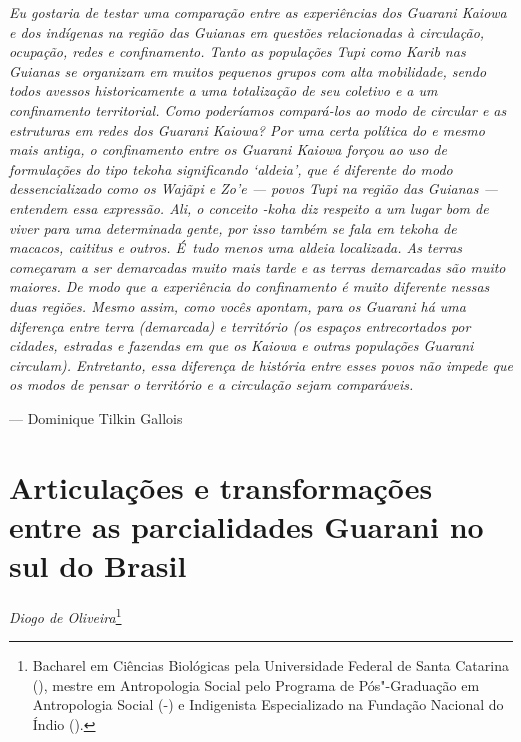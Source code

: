\begin{flushright}
\begin{minipage}[c]{0.85\textwidth}
\raggedleft
\footnotesize
\emph{Eu gostaria de testar uma comparação entre as experiências dos Guarani
Kaiowa e dos indígenas na região das Guianas em questões relacionadas à
circulação, ocupação, redes e confinamento. Tanto as populações Tupi
como Karib nas Guianas se organizam em muitos pequenos grupos com alta
mobilidade, sendo todos avessos historicamente a uma totalização de seu
coletivo e a um confinamento territorial. Como poderíamos compará-los
ao modo de circular e as estruturas em redes dos Guarani Kaiowa? Por
uma certa política do  e mesmo mais antiga, o confinamento entre os
Guarani Kaiowa forçou ao uso de formulações do tipo \emph{tekoha} significando
‘aldeia’, que é diferente do modo dessencializado como os Wajãpi e Zo’e
--- povos Tupi na região das Guianas --- entendem essa expressão. Ali, o
conceito -\emph{koha} diz respeito a um lugar bom de viver para uma
determinada gente, por isso também se fala em \emph{tekoha} de macacos,
caititus e outros. É~tudo menos uma aldeia localizada. As terras
começaram a ser demarcadas muito mais tarde e as terras demarcadas são
muito maiores. De modo que a experiência do confinamento é muito
diferente nessas duas regiões. Mesmo assim, como vocês apontam, para os
Guarani há uma diferença entre terra (demarcada) e território (os
espaços entrecortados por cidades, estradas e fazendas em que os Kaiowa
e outras populações Guarani circulam). Entretanto, essa diferença de
história entre esses povos não impede que os modos de pensar o
território e a circulação sejam comparáveis.}

\smallskip
\hspace*{\fill}--- Dominique Tilkin Gallois
\end{minipage}
\end{flushright}

\thispagestyle{empty}

\chapter*{Articulações e transformações entre as parcialidades Guarani no sul do
Brasil}


\begin{flushright}
\emph{Diogo de Oliveira}\footnote{Bacharel em Ciências Biológicas pela Universidade Federal de Santa Catarina (),
mestre em Antropologia Social pelo Programa de Pós"-Graduação em Antropologia Social (-) e Indigenista
Especializado na Fundação Nacional do Índio ().}
\end{flushright}

